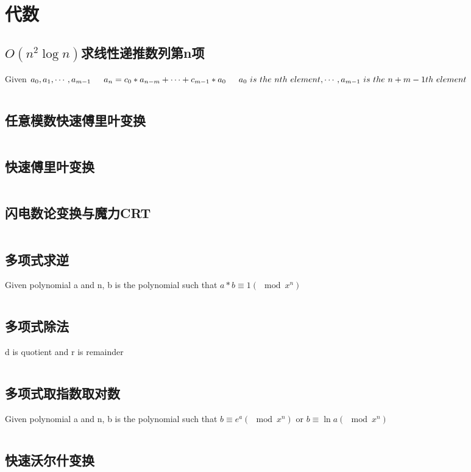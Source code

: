\chapter{代数}
\section{$O(n^2\log n)$求线性递推数列第n项}
Given $a_0, a_1, \cdots , a_{m-1} \\
\indent a_n = c_0 * a_{n-m} + \cdots + c_{m-1} * a_0 \\
\indent a_0 \ is \ the \ nth \ element, \cdots, a_{m-1} \ is \ the \ n+m-1th \ element
$
\inputminted{cpp}{\source/algebra/linear-recursion.cpp}
\section{任意模数快速傅里叶变换}
\inputminted{cpp}{\source/algebra/FFT_1e9+7.cpp}
\section{快速傅里叶变换}
\inputminted{cpp}{\source/algebra/FFT.cpp}
\section{闪电数论变换与魔力CRT}
\inputminted{cpp}{\source/algebra/NTT+CRT.cpp}
\section{多项式求逆}
Given polynomial a and n, b is the polynomial such that $a * b \equiv 1 (\mod x^n) $
\inputminted{cpp}{\source/algebra/polynomial-inverse.cpp}
\section{多项式除法}
d is quotient and r is remainder
\inputminted{cpp}{\source/algebra/polynomial-divide.cpp}
\section{多项式取指数取对数}
Given polynomial a and n, b is the polynomial such that $b \equiv e^a (\mod x^n)$ or $b \equiv \ln a (\mod x^n)$
\inputminted{cpp}{\source/algebra/polynomial-expandln.cpp}
\section{快速沃尔什变换}
\inputminted{cpp}{\source/algebra/FWT.cpp}